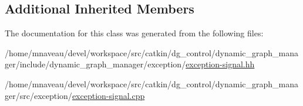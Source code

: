 \subsection*{Additional Inherited Members}


The documentation for this class was generated from the following files\+:\begin{DoxyCompactItemize}
\item 
/home/mnaveau/devel/workspace/src/catkin/dg\+\_\+control/dynamic\+\_\+graph\+\_\+manager/include/dynamic\+\_\+graph\+\_\+manager/exception/\hyperlink{exception-signal_8hh}{exception-\/signal.\+hh}\item 
/home/mnaveau/devel/workspace/src/catkin/dg\+\_\+control/dynamic\+\_\+graph\+\_\+manager/src/exception/\hyperlink{exception-signal_8cpp}{exception-\/signal.\+cpp}\end{DoxyCompactItemize}
